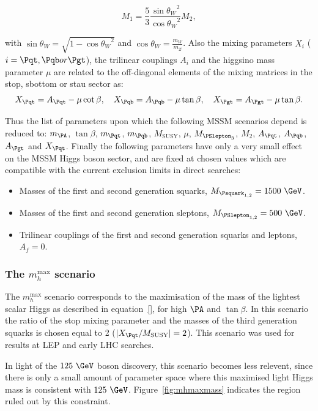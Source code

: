 \begin{equation}
M_{1} = \frac{5}{3}\frac{{\sin{\theta_{W}}}^{2}}{{\cos{\theta_{W}}}^{2}} M_{2},
\end{equation}

with $\sin{\theta_{W}} = \sqrt{1-{\cos{\theta_{W}}}^{2}}$ and 
$\cos{\theta_{W} = \frac{m_{W}}{m_{Z}}}$. Also
the mixing parameters $X_{i}$ ($i=\Pqt,\Pqb or
\Pgt$), the trilinear couplings $A_{i}$ and the higgsino mass parameter $\mu$ 
are related to the off-diagonal elements of the mixing matrices in the
stop, sbottom or stau sector as:
\begin{equation}
X_{\Pqt} = A_{\Pqt} -\mu\cot\beta, \quad X_{\Pqb} = A_{\Pqb} -\mu\tan\beta,
\quad X_{\Pgt} = A_{\Pgt} -\mu\tan\beta .
\end{equation}

Thus the list of parameters upon which the following MSSM scenarios depend is
reduced to: $m_{\PA}$, $\tan\beta$, $m_{\Pqt}$, $m_{\Pqb}$, $M_{\text{SUSY}}$,
$\mu$, $M_{\PSlepton_{3}}$, $M_{2}$, $A_{\Pqt}$, $A_{\Pqb}$, $A_{\Pgt}$ and
$X_{\Pqt}$. Finally the following parameters have only a very small effect on
the MSSM Higgs boson sector, and are fixed at chosen values which are compatible
with the current exclusion limits in direct searches:

\begin{itemize}
\item Masses of the first and second generation squarks, $M_{\Psquark_{1,2}} =
1500~\GeV$.
\item Masses of the first and second generation sleptons,  $M_{\PSlepton_{1,2}}
= 500~\GeV$.
\item Trilinear couplings of the first and second generation squarks and
leptons, $A_{f} = 0$.
\end{itemize}

\subsubsection{The $m_{h}^{\text{max}}$ scenario}
\label{sec:mhmaxscenario}

The $m_{h}^{\text{max}}$ scenario corresponds to the maximisation of the mass of
the lightest scalar Higgs as described in equation~\ref{}, for high $\PA$ and
$\tan\beta$. In this scenario the ratio of the stop mixing parameter and the
masses of the third generation squarks is chosen equal to 2
($|X_{\Pqt}/M_{\text{SUSY}}| = 2$). This scenario was used for results at LEP
and early LHC searches. 

In light of the $125~\GeV$ boson discovery, this scenario becomes less relevent,
since there is only a small amount of parameter space where this maximised light
Higgs mass is consistent with $125~\GeV$. Figure~\ref{fig:mhmaxmass} indicates
the region ruled out by this constraint. 

